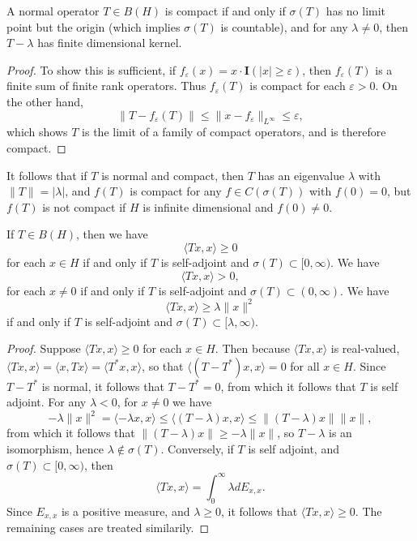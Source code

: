 \begin{theorem}
    A normal operator $T \in B(H)$ is compact if and only if $\sigma(T)$ has no limit point but the origin (which implies $\sigma(T)$ is countable), and for any $\lambda \neq 0$, then $T - \lambda$ has finite dimensional kernel.
\end{theorem}
\begin{proof}
    To show this is sufficient, if $f_\varepsilon(x) = x \cdot \mathbf{I}(|x| \geq \varepsilon)$, then $f_\varepsilon(T)$ is a finite sum of finite rank operators. Thus $f_\varepsilon(T)$ is compact for each $\varepsilon > 0$. On the other hand,
    \[ \| T - f_\varepsilon(T) \| \leq \| x - f_\varepsilon \|_{L^\infty} \leq \varepsilon, \]
    which shows $T$ is the limit of a family of compact operators, and is therefore compact.
\end{proof}

It follows that if $T$ is normal and compact, then $T$ has an eigenvalue $\lambda$ with $\| T \| = |\lambda|$, and $f(T)$ is compact for any $f \in C(\sigma(T))$ with $f(0) = 0$, but $f(T)$ is not compact if $H$ is infinite dimensional and $f(0) \neq 0$.

\begin{theorem}
    If $T \in B(H)$, then we have
    \[ \langle Tx, x \rangle \geq 0 \]
    for each $x \in H$ if and only if $T$ is self-adjoint and $\sigma(T) \subset [0,\infty)$. We have
    \[ \langle Tx, x \rangle > 0, \]
    for each $x \neq 0$ if and only if $T$ is self-adjoint and $\sigma(T) \subset (0,\infty)$. We have
    \[ \langle Tx, x \rangle \geq \lambda \| x \|^2 \]
    if and only if $T$ is self-adjoint and $\sigma(T) \subset [\lambda,\infty)$.
\end{theorem}
\begin{proof}
    Suppose $\langle Tx,x \rangle \geq 0$ for each $x \in H$. Then because $\langle Tx, x \rangle$ is real-valued, $\langle Tx, x \rangle = \langle x, Tx \rangle = \langle T^* x, x \rangle$, so that $\langle (T - T^*) x, x \rangle = 0$ for all $x \in H$. Since $T - T^*$ is normal, it follows that $T - T^* = 0$, from which it follows that $T$ is self adjoint. For any $\lambda < 0$, for $x \neq 0$ we have
    \[ -\lambda \| x \|^2 = \langle -\lambda x, x \rangle \leq \langle (T-\lambda) x, x \rangle \leq \| (T - \lambda) x \| \| x \|, \]
    from which it follows that $\| (T - \lambda) x \| \geq - \lambda \| x \|$, so $T - \lambda$ is an isomorphism, hence $\lambda \not \in \sigma(T)$. Conversely, if $T$ is self adjoint, and $\sigma(T) \subset [0,\infty)$, then
    \[ \langle Tx, x \rangle = \int_0^\infty \lambda dE_{x,x}. \]
    Since $E_{x,x}$ is a positive measure, and $\lambda \geq 0$, it follows that $\langle Tx,x\rangle \geq 0$. The remaining cases are treated similarily.
\end{proof}






